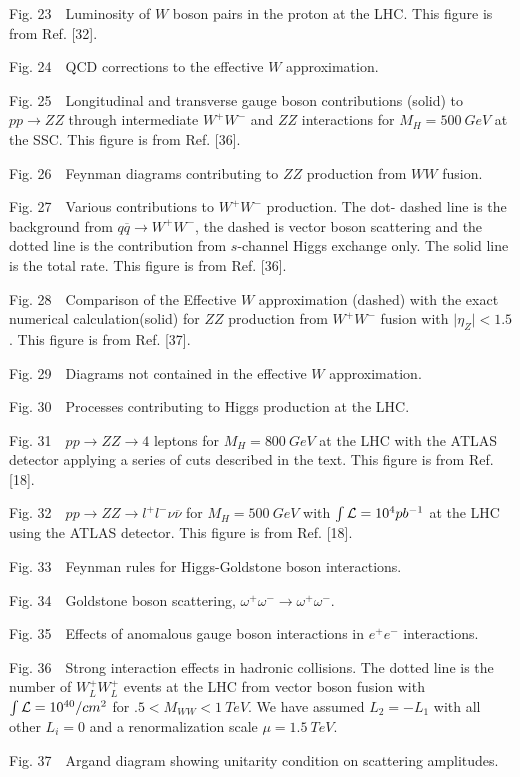 Fig. 23~~Luminosity of $W$ boson pairs in the proton at the LHC.
  This figure is from Ref. [32].

Fig. 24~~QCD corrections to the effective $W$ approximation.

Fig. 25~~Longitudinal and transverse gauge boson contributions (solid) to
$pp\rightarrow ZZ$ through intermediate $W^+W^-$ and $ZZ$
interactions for $M_H=500~GeV$ at the SSC.  This figure is
from Ref. [36].

Fig. 26~~Feynman diagrams contributing to $ZZ$ production
from $WW$ fusion.

Fig. 27~~Various contributions to $W^+W^-$ production.  The dot-
dashed line is the background from $q \overline{q}\rightarrow
W^+W^-$, the dashed is vector boson scattering and the
dotted line is the contribution from $s$-channel Higgs exchange only.
The solid line is the total rate.
This figure is from Ref. [36].


Fig. 28~~Comparison of the Effective $W$ approximation (dashed) with
the exact numerical calculation(solid) for $ZZ$ production
from $W^+W^-$ fusion with $\mid \eta_Z \mid < 1.5$.
This figure is from Ref. [37].

Fig. 29~~Diagrams not contained in the effective $W$ approximation.

Fig. 30~~Processes contributing to Higgs production at the LHC.

Fig. 31~~$pp\rightarrow ZZ\rightarrow 4$
leptons for $M_H=800~GeV$
at the LHC with the ATLAS detector applying a series of cuts described
in the text.  This figure is from Ref. [18].

Fig. 32~~$pp\rightarrow
ZZ\rightarrow l^+l^-\nu{\overline \nu}$ for $M_H=500~GeV$ with
$\int{\cal L}= 10^{4} pb^{-1}$ at the LHC using the ATLAS
detector.  This figure is from Ref. [18].

Fig. 33~~Feynman rules for Higgs-Goldstone boson interactions.

Fig. 34~~Goldstone boson scattering, $\omega^+\omega^-\rightarrow
\omega^+\omega^-$.

Fig. 35~~Effects of anomalous gauge boson interactions in
$e^+e^-$ interactions.

Fig. 36~~Strong interaction effects in hadronic collisions.
The dotted line is the number of $W^+_LW^+_L$ events at the LHC from
vector boson fusion with $\int {\cal L}=10^{40}/cm^2$ for
$.5 < M_{WW}< 1~TeV$.
We have assumed $L_2=-L_1$ with all other $L_i=0$  and a
renormalization scale $\mu=1.5~TeV$.

Fig. 37~~Argand diagram showing unitarity condition on scattering
amplitudes.

